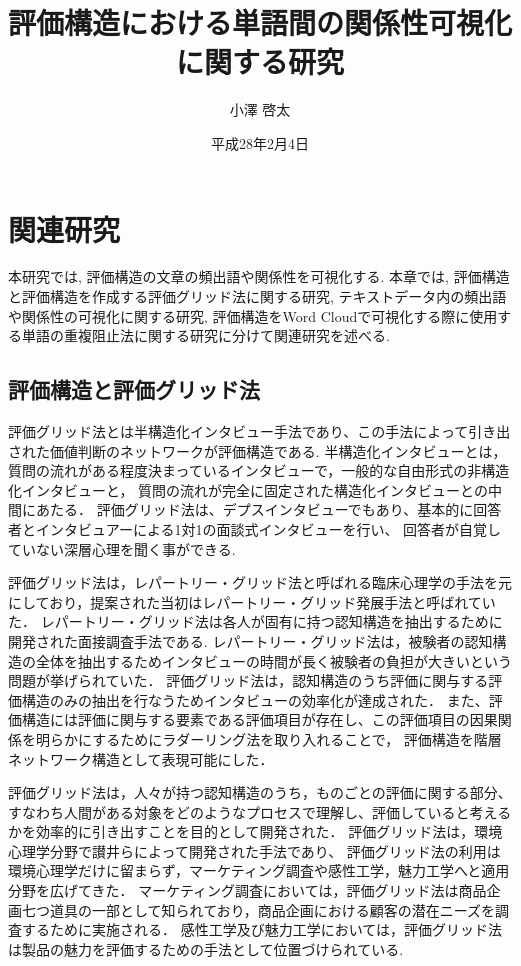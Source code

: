 \documentclass[syuuron]{kuee}
\title{評価構造における単語間の関係性可視化に関する研究}
\author{小澤 啓太}
\date{平成28年2月4日}
\begin{document}
\maketitle
\tableofcontents

\chapter{関連研究}%
	本研究では, 評価構造の文章の頻出語や関係性を可視化する. 本章では, 評価構造と評価構造を作成する評価グリッド法に関する研究, 
	テキストデータ内の頻出語や関係性の可視化に関する研究, 評価構造をWord Cloudで可視化する際に使用する単語の重複阻止法に関する研究に分けて関連研究を述べる. 
	\section{評価構造と評価グリッド法}
		評価グリッド法とは半構造化インタビュー手法であり、この手法によって引き出された価値判断のネットワークが評価構造である\cite{egm6, egm7}. 
		半構造化インタビューとは，質問の流れがある程度決まっているインタビューで，一般的な自由形式の非構造化インタビューと，
		質問の流れが完全に固定された構造化インタビューとの中間にあたる．
		評価グリッド法は、デプスインタビューでもあり、基本的に回答者とインタビュアーによる1対1の面談式インタビューを行い、
		回答者が自覚していない深層心理を聞く事ができる. 
		
		評価グリッド法は，レパートリー・グリッド法\cite{rg1}と呼ばれる臨床心理学の手法を元にしており，提案された当初はレパートリー・グリッド発展手法と呼ばれていた．
		レパートリー・グリッド法は各人が固有に持つ認知構造を抽出するために開発された面接調査手法である. 
		レパートリー・グリッド法は，被験者の認知構造の全体を抽出するためインタビューの時間が長く被験者の負担が大きいという問題が挙げられていた．
		評価グリッド法は，認知構造のうち評価に関与する評価構造のみの抽出を行なうためインタビューの効率化が達成された．
		また、評価構造には評価に関与する要素である評価項目が存在し、この評価項目の因果関係を明らかにするためにラダーリング法を取り入れることで，
		評価構造を階層ネットワーク構造として表現可能にした．
		
		評価グリッド法は，人々が持つ認知構造のうち，ものごとの評価に関する部分、
		すなわち人間がある対象をどのようなプロセスで理解し、評価していると考えるかを効率的に引き出すことを目的として開発された．
		評価グリッド法は，環境心理学分野で讃井らによって開発された手法であり、
		評価グリッド法の利用は環境心理学だけに留まらず，マーケティング調査や感性工学，魅力工学へと適用分野を広げてきた．
		マーケティング調査においては，評価グリッド法は商品企画七つ道具の一部として知られており，商品企画における顧客の潜在ニーズを調査するために実施される．
		感性工学及び魅力工学においては，評価グリッド法は製品の魅力を評価するための手法として位置づけられている. 
		
\end{document}
